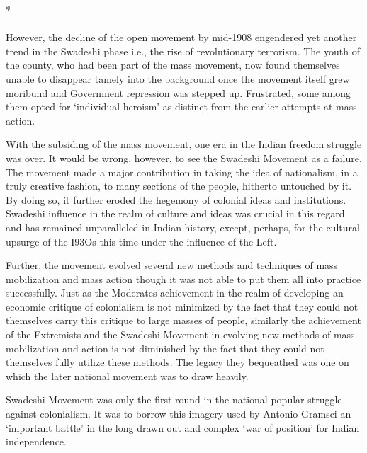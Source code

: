 \begin{center}*\end{center}

\paragraph*{}

However, the decline of the open movement by mid-1908 engendered yet another trend in the Swadeshi phase i.e., the rise of revolutionary terrorism. The youth of the county, who had been part of the mass movement, now found themselves unable to disappear tamely into the background once the movement itself grew moribund and Government repression was stepped up. Frustrated, some among them opted for `individual heroism' as distinct from the earlier attempts at mass action.

With the subsiding of the mass movement, one era in the Indian freedom struggle was over. It would be wrong, however, to see the Swadeshi Movement as a failure. The movement made a major contribution in taking the idea of nationalism, in a truly creative fashion, to many sections of the people, hitherto untouched by it. By doing so, it further eroded the hegemony of colonial ideas and institutions. Swadeshi influence in the realm of culture and ideas was crucial in this regard and has remained unparalleled in Indian history, except, perhaps, for the cultural upsurge of the I93Os this time under the influence of the Left.

Further, the movement evolved several new methods and techniques of mass mobilization and mass action though it was not able to put them all into practice successfully. Just as the Moderates achievement in the realm of developing an economic critique of colonialism is not minimized by the fact that they could not themselves carry this critique to large masses of people, similarly the achievement of the Extremists and the Swadeshi Movement in evolving new methods of mass mobilization and action is not diminished by the fact that they could not themselves fully utilize these methods. The legacy they bequeathed was one on which the later national movement was to draw heavily.

Swadeshi Movement was only the first round in the national popular struggle against colonialism. It was to borrow this imagery used by Antonio Gramsci an `important battle' in the long drawn out and complex `war of position' for Indian independence.
